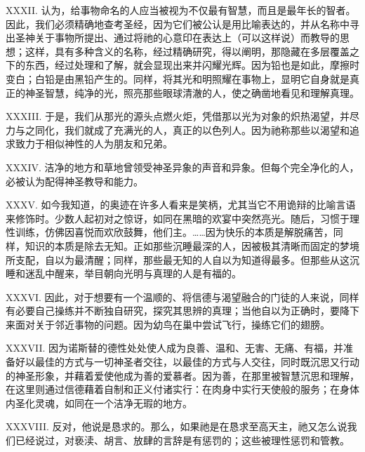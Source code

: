 XXXII. 认为，给事物命名的人应当被视为不仅最有智慧，而且是最年长的智者。因此，我们必须精确地查考圣经，因为它们被公认是用比喻表达的，并从名称中寻出圣神关于事物所提出、通过将祂的心意印在表达上（可以这样说）而教导的思想；这样，具有多种含义的名称，经过精确研究，得以阐明，那隐藏在多层覆盖之下的东西，经过处理和了解，就会显现出来并闪耀光辉。因为铅也是如此，摩擦时变白；白铅是由黑铅产生的。同样，将其光和明照耀在事物上，显明它自身就是真正的神圣智慧，纯净的光，照亮那些眼球清澈的人，使之确凿地看见和理解真理。\par

XXXIII. 于是，我们从那光的源头点燃火炬，凭借那以光为对象的炽热渴望，并尽力与之同化，我们就成了充满光的人，真正的以色列人。因为祂称那些以渴望和追求致力于相似神性的人为朋友和兄弟。\par

XXXIV. 洁净的地方和草地曾领受神圣异象的声音和异象。但每个完全净化的人，必被认为配得神圣教导和能力。\par

XXXV. 如今我知道，的奥迹在许多人看来是笑柄，尤其当它不用诡辩的比喻言语来修饰时。少数人起初对之惊讶，如同在黑暗的欢宴中突然亮光。随后，习惯于理性训练，仿佛因喜悦而欢欣鼓舞，他们主。……因为快乐的本质是解脱痛苦，同样，知识的本质是除去无知。正如那些沉睡最深的人，因被极其清晰而固定的梦境所支配，自以为最清醒；同样，那些最无知的人自以为知道得最多。但那些从这沉睡和迷乱中醒来，举目朝向光明与真理的人是有福的。\par

XXXVI. 因此，对于想要有一个温顺的、将信德与渴望融合的门徒的人来说，同样有必要自己操练并不断独自研究，探究其思辨的真理；当他自以为正确时，要降下来面对关于邻近事物的问题。因为幼鸟在巢中尝试飞行，操练它们的翅膀。\par

XXXVII. 因为诺斯替的德性处处使人成为良善、温和、无害、无痛、有福，并准备好以最佳的方式与一切神圣者交往，以最佳的方式与人交往，同时既沉思又行动的神圣形象，并藉着爱使他成为善的爱慕者。因为善，在那里被智慧沉思和理解，在这里则通过信德藉着自制和正义付诸实行：在肉身中实行天使般的服务；在身体内圣化灵魂，如同在一个洁净无瑕的地方。\par

XXXVIII. 反对，他说是恳求的。那么，如果祂是在恳求至高天主，祂又怎么说我们已经说过，对亵渎、胡言、放肆的言辞是有惩罚的；这些被理性惩罚和管教。\par


